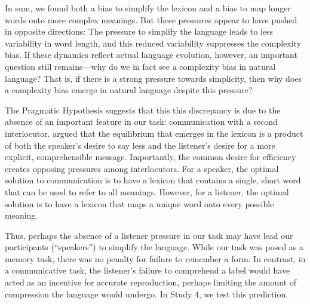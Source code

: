 

In sum, we found both a bias to simplify the lexicon and a bias to map longer words onto more complex meanings. But these pressures appear to have pushed in opposite directions: The pressure to simplify the language leads to less variability in word length, and this reduced variability suppresses the complexity bias. If these dynamics reflect actual language evolution, however, an important question still remains---why do we in fact see a complexity bias in natural language? That is, if there is a strong pressure towards simplicity, then why does a complexity bias emerge in natural language despite this pressure? 

The Pragmatic Hypothesis suggests that this this discrepancy is due to the absence of an important feature in our task: communication with a second interlocutor.  argued that the equilibrium that emerges in the lexicon is a product of both the speaker's desire to say less and the listener's desire for a more explicit, comprehensible message. Importantly, the common desire for efficiency creates opposing pressures among interlocutors. For a speaker, the optimal solution to communication is to have a lexicon that contains a single, short word that can be used to refer to all meanings. However, for a listener, the optimal solution is to have a lexicon that maps a unique word onto every possible meaning. 

Thus, perhaps the absence of a listener pressure in our task may have lead our participants (``speakers'') to simplify the language. While our task was posed as a memory task, there was no penalty for failure to remember a form. In contrast, in a communicative task, the listener's failure to comprehend a label would have acted as an incentive for accurate reproduction, perhaps limiting the amount of compression the language would undergo.  In Study 4, we test this prediction.

